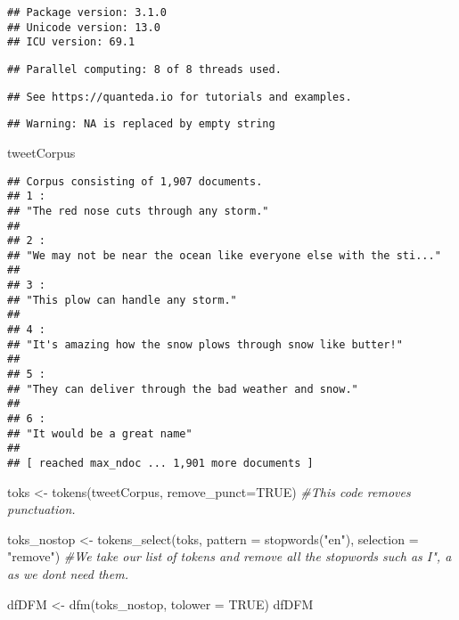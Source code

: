 \documentclass[
]{article}
\newenvironment{Shaded}{\begin{snugshade}}{\end{snugshade}}
\newcommand{\AttributeTok}[1]{\textcolor[rgb]{0.77,0.63,0.00}{#1}}
\newcommand{\CommentTok}[1]{\textcolor[rgb]{0.56,0.35,0.01}{\textit{#1}}}
\newcommand{\ConstantTok}[1]{\textcolor[rgb]{0.00,0.00,0.00}{#1}}
\newcommand{\FunctionTok}[1]{\textcolor[rgb]{0.00,0.00,0.00}{#1}}
\newcommand{\NormalTok}[1]{#1}
\newcommand{\OtherTok}[1]{\textcolor[rgb]{0.56,0.35,0.01}{#1}}
\newcommand{\SpecialCharTok}[1]{\textcolor[rgb]{0.00,0.00,0.00}{#1}}
\newcommand{\StringTok}[1]{\textcolor[rgb]{0.31,0.60,0.02}{#1}}
\begin{document}
\begin{verbatim}
## Package version: 3.1.0
## Unicode version: 13.0
## ICU version: 69.1
\end{verbatim}

\begin{verbatim}
## Parallel computing: 8 of 8 threads used.
\end{verbatim}

\begin{verbatim}
## See https://quanteda.io for tutorials and examples.
\end{verbatim}

\begin{Shaded}
\end{Shaded}

\begin{verbatim}
## Warning: NA is replaced by empty string
\end{verbatim}

\begin{Shaded}
\begin{Highlighting}[]
\NormalTok{tweetCorpus}
\end{Highlighting}
\end{Shaded}

\begin{verbatim}
## Corpus consisting of 1,907 documents.
## 1 :
## "The red nose cuts through any storm."
## 
## 2 :
## "We may not be near the ocean like everyone else with the sti..."
## 
## 3 :
## "This plow can handle any storm."
## 
## 4 :
## "It's amazing how the snow plows through snow like butter!"
## 
## 5 :
## "They can deliver through the bad weather and snow."
## 
## 6 :
## "It would be a great name"
## 
## [ reached max_ndoc ... 1,901 more documents ]
\end{verbatim}

\begin{Shaded}
\begin{Highlighting}[]
\NormalTok{toks }\OtherTok{\textless{}{-}} \FunctionTok{tokens}\NormalTok{(tweetCorpus, }\AttributeTok{remove\_punct=}\ConstantTok{TRUE}\NormalTok{)}
\CommentTok{\#This code removes punctuation.}

\NormalTok{toks\_nostop }\OtherTok{\textless{}{-}} \FunctionTok{tokens\_select}\NormalTok{(toks, }\AttributeTok{pattern =} \FunctionTok{stopwords}\NormalTok{(}\StringTok{"en"}\NormalTok{), }\AttributeTok{selection =} \StringTok{"remove"}\NormalTok{)}
\CommentTok{\#We take our list of tokens and remove all the stopwords such as \textquotesingle{}I", \textquotesingle{}a\textquotesingle{} as we don\textquotesingle{}t need them.}

\NormalTok{dfDFM }\OtherTok{\textless{}{-}} \FunctionTok{dfm}\NormalTok{(toks\_nostop, }\AttributeTok{tolower =} \ConstantTok{TRUE}\NormalTok{)}
\NormalTok{dfDFM}
\end{Highlighting}
\end{Shaded}
\end{document}
